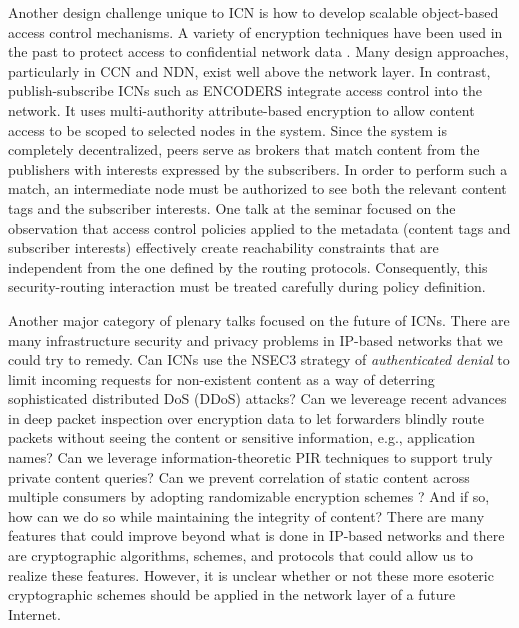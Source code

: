 Another design challenge unique to ICN is how to develop scalable object-based
access control mechanisms. A variety of encryption techniques have been used
in the past to protect access to confidential network data \cite{tourani2016security}.
Many design approaches, particularly in CCN and NDN, exist well above the network
layer. In contrast, publish-subscribe ICNs such as ENCODERS \cite{raykova2015decentralized} integrate
access control into the network. It uses multi-authority attribute-based encryption
to allow content access to be scoped to selected nodes in the system. Since the
system is completely decentralized, peers serve as brokers that match content from
the publishers with interests expressed by the subscribers. In order to perform such a match,
an intermediate node must be authorized to see both the relevant content tags and
the subscriber interests. One talk at the seminar focused on the observation that
access control policies applied to the metadata (content tags and subscriber interests)
effectively create reachability constraints that are independent from the one defined by
the routing protocols. Consequently, this security-routing interaction must be
treated carefully during policy definition.

Another major category of plenary talks focused on the future of ICNs. There are many infrastructure
security and privacy problems in IP-based networks that we could try to remedy. 
Can ICNs use the NSEC3 strategy of \emph{authenticated denial} \cite{blacka2008dns} to limit incoming requests
for non-existent content as a way of deterring sophisticated distributed DoS (DDoS) attacks?
Can we levereage recent advances in deep packet inspection over encryption data \cite{sherry2015blindbox}
to let forwarders blindly route packets without seeing the content or sensitive information,
e.g., application names? Can we leverage information-theoretic PIR techniques \cite{pir-icn} to support
truly private content queries? Can we prevent correlation
of static content across multiple consumers by adopting randomizable encryption schemes \cite{blazy2011signatures}? 
And if so, how can we do so while maintaining the integrity of content? There are many 
features that could improve beyond what is done in IP-based networks and there are cryptographic
algorithms, schemes, and protocols that could allow us to realize these features. However,
it is unclear whether or not these more esoteric cryptographic schemes should be applied in
the network layer of a future Internet. 


